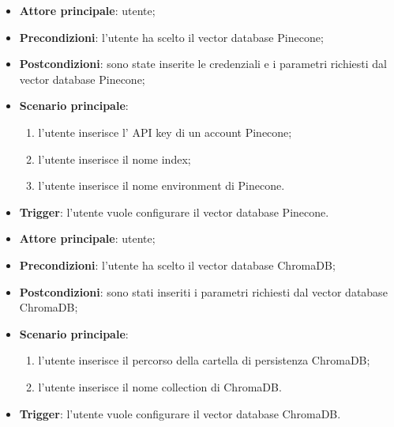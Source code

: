 \documentclass[10pt, a4paper]{article}
\begin{document}
    \begin{itemize}
        \item \textbf{Attore principale}: utente;
        \item \textbf{Precondizioni}: l’utente ha scelto il vector database Pinecone;
        \item \textbf{Postcondizioni}: sono state inserite le credenziali e i parametri richiesti dal vector database Pinecone;
        \item \textbf{Scenario principale}:
            \begin{enumerate}
                \item l’utente inserisce l’ API key di un account Pinecone;
                \item l’utente inserisce il nome index;
                \item l’utente inserisce il nome environment di Pinecone.
            \end{enumerate}
        \item \textbf{Trigger}: l’utente vuole configurare il vector database Pinecone.
    \end{itemize}

    \begin{itemize}
        \item \textbf{Attore principale}: utente;
        \item \textbf{Precondizioni}: l’utente ha scelto il vector database ChromaDB;
        \item \textbf{Postcondizioni}: sono stati inseriti i parametri richiesti dal vector database ChromaDB;
        \item \textbf{Scenario principale}:
            \begin{enumerate}
                \item l’utente inserisce il percorso della cartella di persistenza ChromaDB;
                \item l’utente inserisce il nome collection di ChromaDB.
            \end{enumerate}
        \item \textbf{Trigger}: l’utente vuole configurare il vector database ChromaDB.
    \end{itemize}
\end{document}
